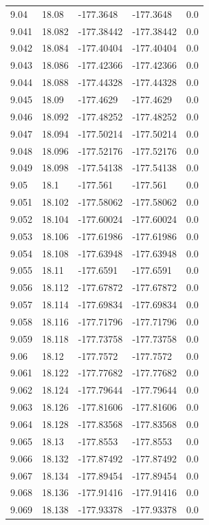 \begin{tabular}{lllll}
9.04 & 18.08 & -177.3648 & -177.3648 & 0.0 \\
9.041 & 18.082 & -177.38442 & -177.38442 & 0.0 \\
9.042 & 18.084 & -177.40404 & -177.40404 & 0.0 \\
9.043 & 18.086 & -177.42366 & -177.42366 & 0.0 \\
9.044 & 18.088 & -177.44328 & -177.44328 & 0.0 \\
9.045 & 18.09 & -177.4629 & -177.4629 & 0.0 \\
9.046 & 18.092 & -177.48252 & -177.48252 & 0.0 \\
9.047 & 18.094 & -177.50214 & -177.50214 & 0.0 \\
9.048 & 18.096 & -177.52176 & -177.52176 & 0.0 \\
9.049 & 18.098 & -177.54138 & -177.54138 & 0.0 \\
9.05 & 18.1 & -177.561 & -177.561 & 0.0 \\
9.051 & 18.102 & -177.58062 & -177.58062 & 0.0 \\
9.052 & 18.104 & -177.60024 & -177.60024 & 0.0 \\
9.053 & 18.106 & -177.61986 & -177.61986 & 0.0 \\
9.054 & 18.108 & -177.63948 & -177.63948 & 0.0 \\
9.055 & 18.11 & -177.6591 & -177.6591 & 0.0 \\
9.056 & 18.112 & -177.67872 & -177.67872 & 0.0 \\
9.057 & 18.114 & -177.69834 & -177.69834 & 0.0 \\
9.058 & 18.116 & -177.71796 & -177.71796 & 0.0 \\
9.059 & 18.118 & -177.73758 & -177.73758 & 0.0 \\
9.06 & 18.12 & -177.7572 & -177.7572 & 0.0 \\
9.061 & 18.122 & -177.77682 & -177.77682 & 0.0 \\
9.062 & 18.124 & -177.79644 & -177.79644 & 0.0 \\
9.063 & 18.126 & -177.81606 & -177.81606 & 0.0 \\
9.064 & 18.128 & -177.83568 & -177.83568 & 0.0 \\
9.065 & 18.13 & -177.8553 & -177.8553 & 0.0 \\
9.066 & 18.132 & -177.87492 & -177.87492 & 0.0 \\
9.067 & 18.134 & -177.89454 & -177.89454 & 0.0 \\
9.068 & 18.136 & -177.91416 & -177.91416 & 0.0 \\
9.069 & 18.138 & -177.93378 & -177.93378 & 0.0 \\

\end{tabular}
